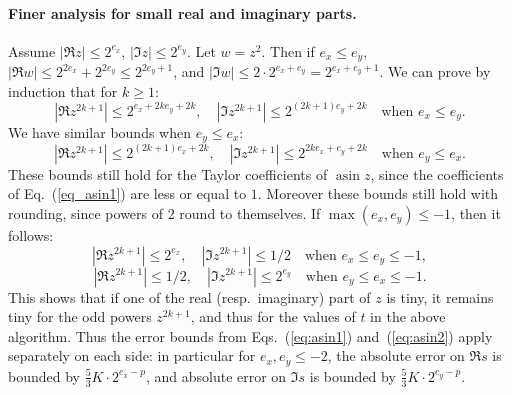 \documentclass [11pt]{article}
\newcommand {\asin}{\operatorname {asin}}
\begin{document}
\paragraph{Finer analysis for small real and imaginary parts.}
Assume $|\Re z| \le 2^{e_x}$, $|\Im z| \le 2^{e_y}$.
Let $w = z^2$.
Then if $e_x \le e_y$,
$|\Re w| \le 2^{2 e_x} + 2^{2e_y} \le 2^{2e_y+1}$,
and $|\Im w| \le 2 \cdot 2^{e_x + e_y} = 2^{e_x + e_y + 1}$.
We can prove by induction that for $k \ge 1$:
\[ |\Re z^{2k+1}| \le 2^{e_x + 2k e_y + 2k}, \quad
   |\Im z^{2k+1}| \le 2^{(2k+1) e_y + 2k} \quad \mbox{when $e_x \le e_y$}. \]
We have similar bounds when $e_y \le e_x$:
\[ |\Re z^{2k+1}| \le 2^{(2k+1) e_x + 2k}, \quad
   |\Im z^{2k+1}| \le 2^{2k e_x + e_y + 2k} \quad \mbox{when $e_y \le e_x$}. \]
 These bounds still hold for the Taylor coefficients of $\asin z$,
 since the coefficients of Eq.~(\ref{eq_asin1}) are less or equal to $1$.
 Moreover these bounds still hold with rounding, since powers of $2$ round
 to themselves.
 If $\max(e_x,e_y) \le -1$, then it follows:
\[ |\Re z^{2k+1}| \le 2^{e_x}, \quad
   |\Im z^{2k+1}| \le 1/2 \quad \mbox{when $e_x \le e_y \le -1$}, \]
\[ |\Re z^{2k+1}| \le 1/2, \quad
  |\Im z^{2k+1}| \le 2^{e_y} \quad \mbox{when $e_y \le e_x \le -1$}. \]
This shows that if one of the real (resp.~imaginary) part of $z$ is tiny,
it remains tiny for the odd powers $z^{2k+1}$, and thus for the values
of $t$ in the above algorithm.
Thus the error bounds from Eqs.~(\ref{eq:asin1}) and~(\ref{eq:asin2})
apply separately on each side: in particular for $e_x, e_y \le -2$,
the absolute error on $\Re s$ is
bounded by $\frac{5}{3} K \cdot 2^{e_x-p}$, and absolute error on $\Im s$ is
bounded by $\frac{5}{3} K \cdot 2^{e_y-p}$.
\end{document}
